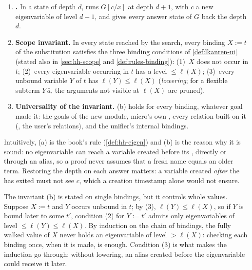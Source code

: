 \begin{definition}\label{def:design-a1}\leavevmode
\begin{enumerate}[label=(\alph*)]
\item \textbf{.} In a state of depth $d$,  runs $G[c/x]$ at depth $d+1$, with
  $c$ a new eigenvariable of level $d+1$, and gives every answer state of $G$ back the depth $d$.
\item \textbf{Scope invariant.} In every state reached by the search, every binding $X:=t$ of the
  substitution satisfies the three binding conditions of \cref{def:lkanren-ui} (stated also in \cref{sec:hh-scope} and
  \cref{def:rules-binding}):
  (1)~$X$ does not occur in $t$; (2)~every eigenvariable occurring in $t$ has a level $\le \ell(X)$;
  (3)~every unbound variable $Y$ of $t$ has $\ell(Y)\le\ell(X)$ (\emph{lowering}; for a flexible
  subterm $Y\,\bar a$, the arguments not visible at $\ell(X)$ are pruned).
\item \textbf{Universality of the invariant.} (b) holds for every binding, whatever goal made it: the
  goals of the new module, micro's own , every relation built on it (, the user's
  relations), and the unifier's internal bindings.
\end{enumerate}
\end{definition}

Intuitively, (a) is the book's  rule  (\cref{def:hh-eigen}) and (b) is the reason why
it is sound: no eigenvariable can reach a variable created before its , directly or through an
alias, so a proof never assumes that a fresh name equals an older term. Restoring the depth on each
answer matters: a variable created \emph{after} the  has exited must not see $c$, which a creation
timestamp alone would not ensure.

The invariant (b) is stated on single bindings, but it controls whole values. Suppose $X:=t$ and $Y$
occurs unbound in $t$; by (3), $\ell(Y)\le\ell(X)$, so if $Y$ is bound later to some $t'$, condition
(2) for $Y:=t'$ admits only eigenvariables of level $\le\ell(Y)\le\ell(X)$. By induction on the
chain of bindings, the fully walked value of $X$ never holds an eigenvariable of level $>\ell(X)$:
checking each binding once, when it is made, is enough. Condition (3) is what makes the induction go
through; without lowering, an alias created before the eigenvariable could receive it later.

